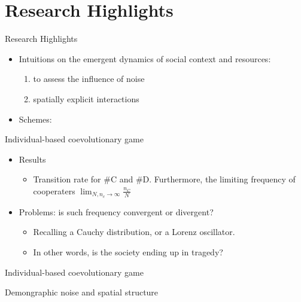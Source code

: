 \section{Research Highlights}
\begin{frame}{Research Highlights}
    \begin{itemize}
        \item Intuitions on the emergent dynamics of social context and resources:
        \begin{enumerate}
            \item to assess the influence of noise
            \item spatially explicit interactions
        \end{enumerate}
        \item Schemes:
    \end{itemize}
\end{frame}

\begin{frame}{Individual-based coevolutionary game}
    \begin{itemize}
        \item Results
        \begin{itemize}
            \item Transition rate for \#C and \#D. Furthermore, the limiting frequency of cooperaters $\lim_{N,n_c\rightarrow \infty}\frac{n_C}{N} $
        \end{itemize}
        \item Problems: is such frequency convergent or divergent?
        \begin{itemize}
            \item Recalling a Cauchy distribution, or a Lorenz oscillator.
            \item In other words, is the society ending up in tragedy?
        \end{itemize}
    \end{itemize}
\end{frame}

\begin{frame}{Individual-based coevolutionary game}

\end{frame}

\begin{frame}{Demongraphic noise and spatial structure}

\end{frame}